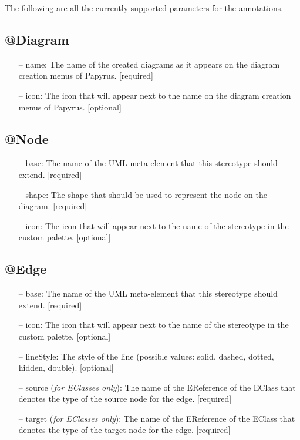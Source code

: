 The following are all the currently supported parameters for the annotations.

\subsection{@Diagram}
\begin{itemize}
	\item[--] name: The name of the created diagrams as it appears on the diagram creation menus of Papyrus. [required]
	\item[--] icon: The icon that will appear next to the name on the diagram creation menus of Papyrus. [optional]
\end{itemize}

\subsection{@Node}
\begin{itemize}
	\item[--] base: The name of the UML meta-element that this stereotype should extend. [required]
	\item[--] shape: The shape that should be used to represent the node on the diagram. [required]		\item[--] icon: The icon that will appear next to the name of the stereotype in the custom palette. [optional]
\end{itemize}

\subsection{@Edge}
\begin{itemize}
	\item[--] base: The name of the UML meta-element that this stereotype should extend. [required]
	\item[--] icon: The icon that will appear next to the name of the stereotype in the custom palette. [optional]
	\item[--] lineStyle: The style of the line (possible values: solid, dashed, dotted, hidden, double). [optional]
	\item[--] source (\textit{for EClasses only}): The name of the EReference of the EClass that denotes the type of the source node for the edge. [required]
		\item[--] target (\textit{for EClasses only}): The name of the EReference of the EClass that denotes the type of the target node for the edge. [required]
\end{itemize}